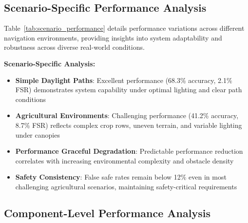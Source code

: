 \documentclass[10pt]{article}
\newcommand{\tabref}[1]{Table~\ref{#1}}
\begin{document}
\subsection{Scenario-Specific Performance Analysis}

\tabref{tab:scenario_performance} details performance variations across different navigation environments, providing insights into system adaptability and robustness across diverse real-world conditions.

\begin{table}[ht]
\centering
\caption{Performance Analysis Across Navigation Scenarios}
\label{tab:scenario_performance}
\end{table}

\textbf{Scenario-Specific Analysis:}
\begin{itemize}
\item \textbf{Simple Daylight Paths}: Excellent performance (68.3\% accuracy, 2.1\% FSR) demonstrates system capability under optimal lighting and clear path conditions
\item \textbf{Agricultural Environments}: Challenging performance (41.2\% accuracy, 8.7\% FSR) reflects complex crop rows, uneven terrain, and variable lighting under canopies
\item \textbf{Performance Graceful Degradation}: Predictable performance reduction correlates with increasing environmental complexity and obstacle density
\item \textbf{Safety Consistency}: False safe rates remain below 12\% even in most challenging agricultural scenarios, maintaining safety-critical requirements
\end{itemize}

\subsection{Component-Level Performance Analysis}
\end{document}
